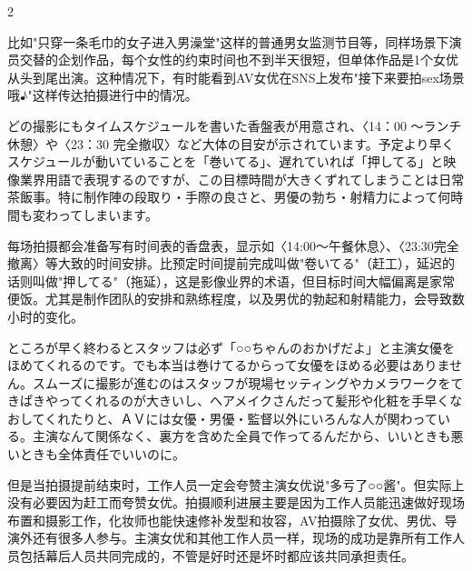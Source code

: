 \documentclass[12pt,UTF8]{ctexbook}
\begin{document}
\begin{paracol}{2}
\switchcolumn

比如"只穿一条毛巾的女子进入男澡堂"这样的普通男女监测节目等，同样场景下演员交替的企划作品，每个女性的约束时间也不到半天很短，但单体作品是1个女优从头到尾出演。这种情况下，有时能看到AV女优在SNS上发布"接下来要拍sex场景哦♪"这样传达拍摄进行中的情况。

\switchcolumn*

どの撮影にもタイムスケジュールを書いた香盤表が用意され、〈14：00 〜ランチ休憩〉や〈23：30 完全撤収〉など大体の目安が示されています。予定より早くスケジュールが動いていることを「巻いてる」、遅れていれば「押してる」と映像業界用語で表現するのですが、この目標時間が大きくずれてしまうことは日常茶飯事。特に制作陣の段取り・手際の良さと、男優の勃ち・射精力によって何時間も変わってしまいます。

\switchcolumn

每场拍摄都会准备写有时间表的香盘表，显示如〈14:00〜午餐休息〉、〈23:30完全撤离〉等大致的时间安排。比预定时间提前完成叫做"卷いてる"（赶工），延迟的话则叫做"押してる"（拖延），这是影像业界的术语，但目标时间大幅偏离是家常便饭。尤其是制作团队的安排和熟练程度，以及男优的勃起和射精能力，会导致数小时的变化。

\switchcolumn*

ところが早く終わるとスタッフは必ず「○○ちゃんのおかげだよ」と主演女優をほめてくれるのです。でも本当は巻けてるからって女優をほめる必要はありません。スムーズに撮影が進むのはスタッフが現場セッティングやカメラワークをてきぱきやってくれるのが大きいし、ヘアメイクさんだって髪形や化粧を手早くなおしてくれたりと、ＡＶには女優・男優・監督以外にいろんな人が関わっている。主演なんて関係なく、裏方を含めた全員で作ってるんだから、いいときも悪いときも全体責任でいいのに。

\switchcolumn

但是当拍摄提前结束时，工作人员一定会夸赞主演女优说"多亏了○○酱"。但实际上没有必要因为赶工而夸赞女优。拍摄顺利进展主要是因为工作人员能迅速做好现场布置和摄影工作，化妆师也能快速修补发型和妆容，AV拍摄除了女优、男优、导演外还有很多人参与。主演女优和其他工作人员一样，现场的成功是靠所有工作人员包括幕后人员共同完成的，不管是好时还是坏时都应该共同承担责任。

\switchcolumn*


\end{paracol}
\end{document}
